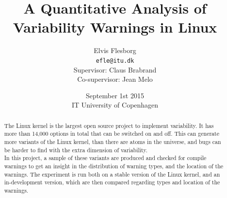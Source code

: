 \documentclass[a4paper,11pt]{report}
\begin{document}
\setlength{\parindent}{0cm}
\setlength{\unitlength}{1mm}

\date{September 1st 2015\\ IT University of Copenhagen}
\title{A Quantitative Analysis of Variability Warnings in Linux}
\author{Elvis Flesborg\\
\texttt{efle@itu.dk}\\
Supervisor: Claus Brabrand\\
Co-supervisor: Jean Melo}
\clearpage\maketitle
\thispagestyle{empty}
\newpage

\tableofcontents
\thispagestyle{empty}



\newpage

\setcounter{page}{1}


            \begin{abstract}

The Linux kernel is the largest open source project to implement variability. It
has more than 14,000 options in total that can be switched on and off. This can 
generate more variants of the Linux kernel, than there are atoms in the 
universe, and bugs can be harder to find with the extra dimension of 
variability.
\\

In this project, a sample of these variants are produced and checked for compile
warnings to get an insight in the distribution of warning types, and the 
location of the warnings. The experiment is run both on a stable version of the 
Linux kernel, and an in-development version, which are then compared regarding 
types and location of the warnings.



            \end{abstract}


\end{document}
